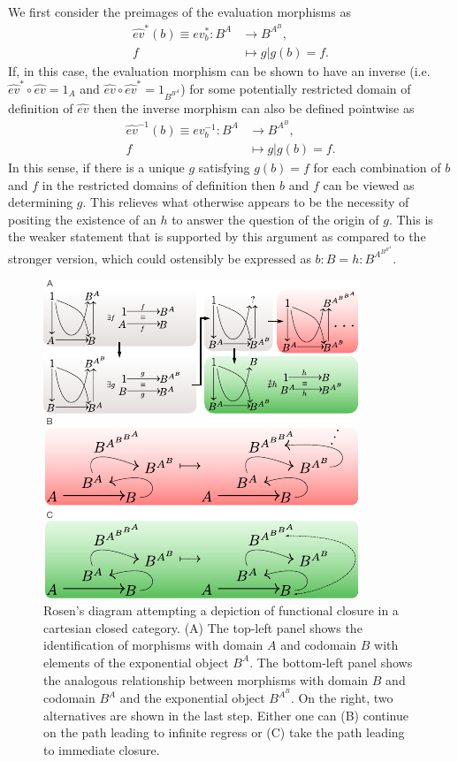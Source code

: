 We first consider the preimages of the evaluation morphisms as
\begin{align*}
\hat{ev}^{*}(b) \equiv ev^{*}_b \colon B^A &\longrightarrow B^{A^B},\\
f &\longmapsto g |g(b)=f.
\end{align*}
If, in this case, the evaluation morphism can be shown to have an inverse (i.e. $\hat{ev}^{*} \circ \hat{ev} = 1_A$ and $\hat{ev} \circ \hat{ev}^{*}= 1_{B^{B^A}}$) for some potentially restricted domain of definition of $\hat{ev}$ then the inverse morphism can also be defined pointwise as
\begin{align*}
\hat{ev}^{-1}(b) \equiv ev^{-1}_b \colon B^A &\longrightarrow B^{A^B},\\
f &\longmapsto g | g(b) = f.
\end{align*}
In this sense, if there is a unique $g$ satisfying $g(b)=f$ for each combination of $b$ and $f$ in the restricted domains of definition then $b$ and $f$ can be viewed as determining $g$. This relieves what otherwise appears to be the necessity of positing the existence of an $h$ to answer the question of the origin of $g$. This is the weaker statement that is supported by this argument as compared to the stronger version, which could ostensibly be expressed as $b:B = h:B^{A^{B^{B^A}}}$.

\begin{figure}
\begin{center}
\noindent\includegraphics[width=0.75\columnwidth]{fig/mrcatclosure.pdf}
\end{center}
\caption{Rosen's diagram attempting a depiction of functional closure in a cartesian closed category. (A) The top-left panel shows the identification of morphisms with domain $A$ and codomain $B$ with elements of the exponential object $B^A$. The bottom-left panel shows the analogous relationship between morphisms with domain $B$ and codomain $B^A$ and the exponential object $B^{A^B}$. On the right, two alternatives are shown in the last step. Either one can (B) continue on the path leading to infinite regress or (C) take the path leading to immediate closure.}
\label{fig:hom}
\end{figure}

